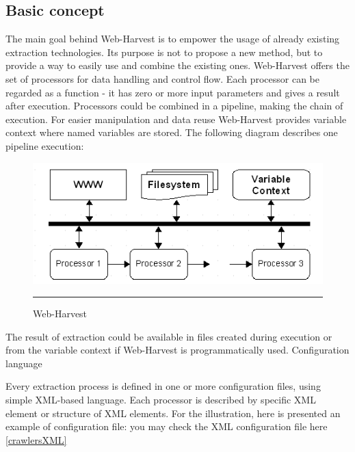 \subsection{Basic concept}
The main goal behind Web-Harvest is to empower the usage of already existing extraction technologies. Its purpose is not to propose a new method, but to provide a way to easily use and combine the existing ones. Web-Harvest offers the set of processors for data handling and control flow. Each processor can be regarded as a function - it has zero or more input parameters and gives a result after execution. Processors could be combined in a pipeline, making the chain of execution. For easier manipulation and data reuse Web-Harvest provides variable context where named variables are stored. The following diagram describes one pipeline execution:

\begin{figure}[htbp]
	\centering
		\includegraphics{./Figures/diagram1.png}
		\rule{35em}{0.5pt}
	\caption[Web-Harvest]{Web-Harvest}
\end{figure}


The result of extraction could be available in files created during execution or from the variable context if Web-Harvest is programmatically used.
Configuration language

Every extraction process is defined in one or more configuration files, using simple XML-based language. Each processor is described by specific XML element or structure of XML elements. For the illustration, here is presented an example of configuration file:
you may check the XML configuration file here \ref{crawlersXML}

